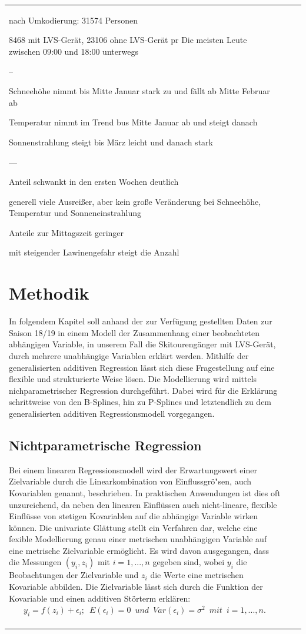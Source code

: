 \documentclass[11pt,a4paper]{report}
\begin{document}
\begin{table}
\begin{tabular}{p{3cm}|p{5cm}|p{4cm}}
\begin{document}
	nach Umkodierung: 31574 Personen
	
	8468 mit LVS-Gerät, 23106 ohne LVS-Gerät
	pr
	Die meisten Leute zwischen 09:00 und 18:00 unterwegs
	
	--
	
	Schneehöhe nimmt bis Mitte Januar stark zu und fällt ab Mitte Februar ab
	
	Temperatur nimmt im Trend bus Mitte Januar ab und steigt danach
	
	Sonnenstrahlung steigt bis März leicht und danach stark
	
	
	---
	
	
	Anteil schwankt in den ersten Wochen deutlich
	
	generell viele Ausreißer, aber kein große Veränderung bei Schneehöhe, Temperatur und Sonneneinstrahlung
	
	Anteile zur Mittagszeit geringer
	
	mit steigender Lawinengefahr steigt die Anzahl
	
	\chapter{Methodik}
	In folgendem Kapitel soll anhand der zur Verfügung gestellten Daten zur Saison 18/19 in einem Modell der Zusammenhang einer beobachteten abhängigen Variable, in unserem Fall die Skitourengänger mit LVS-Gerät,  durch mehrere unabhängige Variablen erklärt werden.
	Mithilfe der generalisierten additiven Regression lässt sich diese Fragestellung auf eine flexible und strukturierte Weise lösen. Die Modellierung wird mittels nichparametrischer Regression durchgeführt.
	Dabei wird für die Erklärung schrittweise von den B-Splines, hin zu P-Splines und letztendlich zu dem generalisierten additiven Regressionsmodell vorgegangen.
	
	\section{Nichtparametrische Regression}
	Bei einem linearen Regressionsmodell wird der Erwartungswert einer  Zielvariable durch die Linearkombination von Einflussgrö"sen, auch  Kovariablen genannt, beschrieben. In praktischen Anwendungen ist dies oft unzureichend, da neben den linearen Einflüssen auch nicht-lineare, flexible Einflüsse von stetigen Kovariablen auf die abhängige Variable wirken können.
	Die univariate Glättung stellt ein Verfahren dar, welche eine fexible Modellierung genau einer metrischen unabhängigen Variable auf eine metrische Zielvariable ermöglicht. Es wird davon ausgegangen, dass die Messungen $(y_{i},z_{i})$ mit $i=1,...,n$ gegeben sind, wobei $y_{i}$ die Beobachtungen der Zielvariable und $z_{i}$ die Werte eine metrischen Kovariable abbilden. Die Zielvariable lässt sich durch die Funktion der Kovariable und einen additiven Störterm erklären:
	\begin{align}
	y_{i}=f(z_{i})+\epsilon_{i};\enspace E(\epsilon_{i})=0 \enspace und \enspace Var(\epsilon_{i})=\sigma^2 \enspace mit \enspace i=1,...,n.
	\end{align}
	

\end{document}
\end{tabular}
\end{table}
\end{document}
